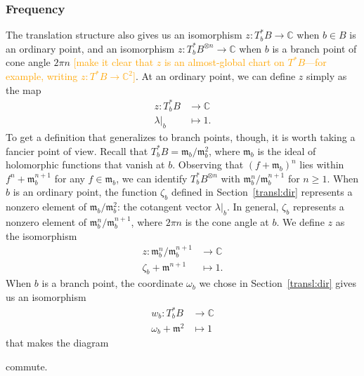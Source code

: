 \documentclass{article}
\newcommand{\maps}{\colon}
\newcommand{\C}{\mathbb{C}}
\newcommand{\blankbox}{{\fboxsep 0pt \colorbox{lightgray}{\phantom{$h$}}}}
\newcommand{\van}{\mathfrak{m}}
\theoremstyle{definition}
\theoremstyle{plain}
\begin{document}
\subsubsection{Frequency}\label{transl-freq}
%
The translation structure also gives us an isomorphism $z \maps T^*_bB \to \C$ when $b \in B$ is an ordinary point, and an isomorphism $z \maps T^*_bB^{\otimes n} \to \C$ when $b$ is a branch point of cone angle $2\pi n$ \textcolor{orange}{[make it clear that $z$ is an almost-global chart on $T^*B$---for example, writing $z\colon T^*B\to\C^2$]}. At an ordinary point, we can define $z$ simply as the map
\begin{align*}
z \maps T^*_bB & \to \C \\
\lambda\big|_b & \mapsto 1.
\end{align*}
To get a definition that generalizes to branch points, though, it is worth taking a fancier point of view. Recall that $T^*_bB = \van_b / \van_b^2$, where $\van_b$ is the ideal of holomorphic functions that vanish at $b$. Observing that $(f + \van_b)^n$ lies within $f^n + \van_b^{n+1}$ for any $f \in \van_b$, we can identify $T^*_bB^{\otimes n}$ with $\van_b^n / \van_b^{n+1}$ for $n \ge 1$. When $b$ is an ordinary point, the function $\zeta_b$ defined in Section~\ref{transl:dir} represents a nonzero element of $\van_b / \van_b^2$: the cotangent vector $\lambda\big|_b$. In general, $\zeta_b$ represents a nonzero element of $\van_b^n / \van_b^{n+1}$, where $2\pi n$ is the cone angle at $b$. We define $z$ as the isomorphism
\begin{align*}
z \maps \van_b^n / \van_b^{n+1} & \to \C \\
\zeta_b + \van^{n+1} & \mapsto 1.
\end{align*}
When $b$ is a branch point, the coordinate $\omega_b$ we chose in Section~\ref{transl:dir} gives us an isomorphism
\begin{align*}
w_b \maps T^*_bB & \to \C \\
\omega_b + \van^2 & \mapsto 1
\end{align*}
that makes the diagram
\begin{center}
\end{center}
commute.
\end{document}
